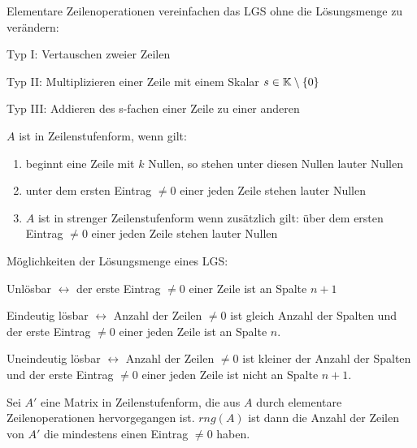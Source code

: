 \begin{satz}[Zeilenoperationen]
	Elementare Zeilenoperationen vereinfachen das LGS ohne die Lösungsmenge zu verändern:
	\begin{description}[noitemsep]
		\item Typ I: Vertauschen zweier Zeilen
		\item Typ II: Multiplizieren einer Zeile mit einem Skalar $s \in \mathbb{K} \setminus \{0\}$
		\item Typ III: Addieren des s-fachen einer Zeile zu einer anderen
	\end{description}
\end{satz}

\begin{definition}[Zeilenstufenform]
	$A$ ist in Zeilenstufenform, wenn gilt:
	\begin{enumerate}[noitemsep]
		\item beginnt eine Zeile mit $k$ Nullen, so stehen unter diesen Nullen lauter Nullen
		\item unter dem ersten Eintrag $\neq 0$ einer jeden Zeile stehen lauter Nullen
		\item $A$ ist in strenger Zeilenstufenform wenn zusätzlich gilt: über dem ersten Eintrag $\neq 0$ einer jeden Zeile stehen lauter Nullen
	\end{enumerate}
\end{definition}

\begin{satz}
	Möglichkeiten der Lösungsmenge eines LGS:
	\begin{description}[noitemsep]
		\item Unlösbar $\leftrightarrow$ der erste Eintrag $\neq 0$ einer Zeile ist an Spalte $n+1$
		\item Eindeutig lösbar $\leftrightarrow$ Anzahl der Zeilen $\neq 0$ ist gleich Anzahl der Spalten und der erste Eintrag $\neq 0$ einer jeden Zeile ist an Spalte $n$.
		\item Uneindeutig lösbar $\leftrightarrow$ Anzahl der Zeilen $\neq 0$ ist kleiner der Anzahl der Spalten und der erste Eintrag $\neq 0$ einer jeden Zeile ist nicht an Spalte $n+1$.		
	\end{description}
\end{satz}

\begin{definition}
	Sei $A'$ eine Matrix in Zeilenstufenform, die aus $A$ durch elementare Zeilenoperationen hervorgegangen ist. $rng(A)$ ist dann die Anzahl der Zeilen von $A'$ die mindestens einen Eintrag $\neq 0$ haben.
\end{definition}

